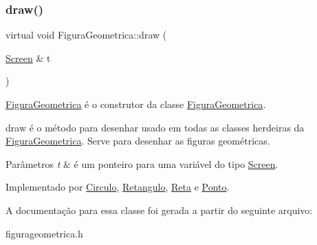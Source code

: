 \subsubsection{\texorpdfstring{draw()}{draw()}}
{\footnotesize\ttfamily virtual void Figura\+Geometrica\+::draw (\begin{DoxyParamCaption}\item[{\mbox{\hyperlink{class_screen}{Screen}} \&}]{t }\end{DoxyParamCaption})\hspace{0.3cm}{\ttfamily [pure virtual]}}



\mbox{\hyperlink{class_figura_geometrica}{Figura\+Geometrica}} é o construtor da classe \mbox{\hyperlink{class_figura_geometrica}{Figura\+Geometrica}}. 

draw é o método para desenhar usado em todas as classes herdeiras da \mbox{\hyperlink{class_figura_geometrica}{Figura\+Geometrica}}. Serve para desenhar as figuras geométricas. 
\begin{DoxyParams}{Parâmetros}
{\em t} & é um ponteiro para uma variável do tipo \mbox{\hyperlink{class_screen}{Screen}}. \\
\hline
\end{DoxyParams}


Implementado por \mbox{\hyperlink{class_circulo_a593787d6e0618c2eded23e8839e7bea6}{Circulo}}, \mbox{\hyperlink{class_retangulo_ac088dd6d3f4f3d3f80363a868c2e74f1}{Retangulo}}, \mbox{\hyperlink{class_reta_ac2e9805183cd474b62bffd8b032cd780}{Reta}} e \mbox{\hyperlink{class_ponto_acc49c2522288aea2819458f245bbc9df}{Ponto}}.



A documentação para essa classe foi gerada a partir do seguinte arquivo\+:\begin{DoxyCompactItemize}
\item 
figurageometrica.\+h\end{DoxyCompactItemize}
